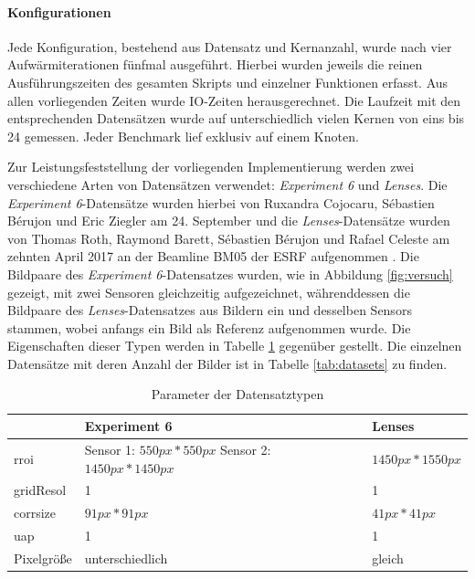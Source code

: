\paragraph{Konfigurationen}

Jede Konfiguration, bestehend aus Datensatz und Kernanzahl, wurde nach vier Aufwärmiterationen fünfmal ausgeführt. Hierbei wurden jeweils die reinen Ausführungszeiten des gesamten Skripts und einzelner Funktionen erfasst. Aus allen vorliegenden Zeiten wurde \gls{IO}-Zeiten herausgerechnet. Die Laufzeit mit den entsprechenden Datensätzen wurde auf unterschiedlich vielen Kernen von eins bis 24 gemessen. Jeder Benchmark lief exklusiv auf einem Knoten. 

Zur Leistungsfeststellung der vorliegenden Implementierung werden zwei verschiedene Arten von Datensätzen verwendet: \textit{Experiment 6} und \textit{Lenses}. Die \textit{Experiment 6}-Datensätze wurden hierbei von Ruxandra Cojocaru, Sébastien Bérujon und Eric Ziegler am 24. September und die \textit{Lenses}-Datensätze wurden von Thomas Roth, Raymond Barett, Sébastien Bérujon und Rafael Celeste am zehnten April 2017 an der Beamline BM05 der \gls{ESRF} aufgenommen \cite{CBZ17, RBB+17}. Die Bildpaare des \textit{Experiment 6}-Datensatzes wurden, wie in Abbildung \ref{fig:versuch} gezeigt, mit zwei Sensoren gleichzeitig aufgezeichnet, währenddessen die Bildpaare des \textit{Lenses}-Datensatzes aus Bildern ein und desselben Sensors stammen, wobei anfangs ein Bild als Referenz aufgenommen wurde. Die Eigenschaften dieser Typen werden in Tabelle \ref{tab:dataset_types} gegenüber gestellt. Die einzelnen Datensätze mit deren Anzahl der Bilder ist in Tabelle \ref{tab:datasets} zu finden. 

\begin{table}
	\begin{tabularx}{\textwidth}{@{} XXX @{}}
		\toprule
		& Experiment 6 & Lenses \\
		\hline
		\gls{rroi} & Sensor 1: $550px * 550px$ \newline
		Sensor 2: $1450px * 1450px$  & $1450px * 1550px$ \\
		\gls{gridResol} & 1 & 1 \\
		\gls{corrsize} & $91px * 91px$ & $41px * 41px$ \\
		\gls{uap} & 1 & 1 \\
		Pixelgröße & unterschiedlich & gleich \\
		\bottomrule
	\end{tabularx}
	\caption{Parameter der Datensatztypen}
	\label{tab:dataset_types}
\end{table}


